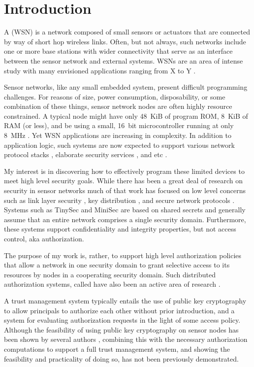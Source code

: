 \chapter{Introduction}
\label{chapter-introduction}

A  (WSN) is a network composed of small sensors or actuators
that are connected by way of short hop wireless links. Often, but not always, such networks
include one or more base stations with wider connectivity that serve as an interface between the
sensor network and external systems. WSNs are an area of intense study with many envisioned
applications ranging from X to Y \cite{XXX}.

Sensor networks, like any small embedded system, present difficult programming challenges. For
reasons of size, power consumption, disposability, or some combination of these things, sensor
network nodes are often highly resource constrained. A typical node might have only 48~KiB of
program ROM, 8~KiB of RAM (or less), and be using a small, 16~bit microcontroller running at
only 8~MHz \cite{tmotesky-datasheet}. Yet WSN applications are increasing in complexity. In
addition to application logic, such systems are now expected to support various network protocol
stacks \cite{XXX}, elaborate security services \cite{XXX}, and etc \cite{XXX}.

My interest is in discovering how to effectively program these limited devices to meet high
level security goals. While there has been a great deal of research on security in sensor
networks much of that work has focused on low level concerns such as link layer security
\cite{XXX}, key distribution \cite{XXX}, and secure network protocols \cite{1049776,XXX}.
Systems such as TinySec \cite{karlog-tinysec-2004} and MiniSec \cite{luk-minisec-2007} are based
on shared secrets and generally assume that an entire network comprises a single security
domain. Furthermore, these systems support confidentiality and integrity properties, but not
access control, aka authorization.

The purpose of my work is, rather, to support high level authorization policies that allow a
network in one security domain to grant selective access to its resources by nodes in a
cooperating security domain. Such distributed authorization systems, called  have also been an active area of research
\cite{chapin-skalka-wang-acmcs08}.

A trust management system typically entails the use of public key cryptography to allow
principals to authorize each other without prior introduction, and a system for evaluating
authorization requests in the light of some access policy. Although the feasibility of using
public key cryptography on sensor nodes has been shown by several authors
\cite{1049776,Malan:2008:IPI:1387663.1387668,bertoni-2006,kumar-2006,4604657,Liu-Peng-TinyECC-2008,Szczechowiak:2008:NTL:1786014.1786040},
combining this with the necessary authorization computations to support a full trust management
system, and showing the feasibility and practicality of doing so, has not been previously
demonstrated.

